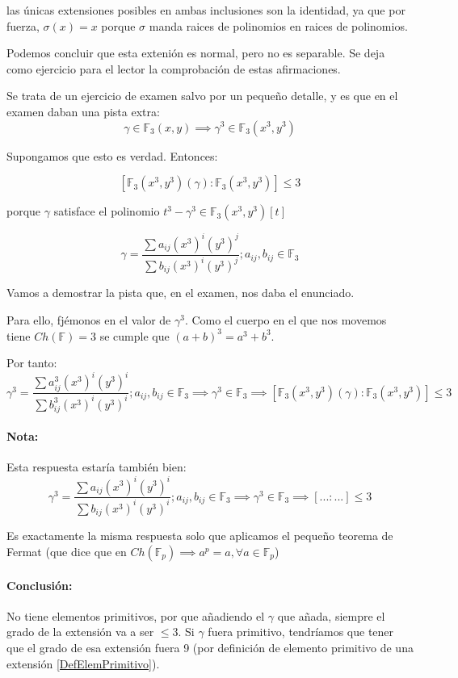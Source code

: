 \begin{problem}[3]
las únicas extensiones posibles en ambas inclusiones son la identidad, ya que por fuerza, $σ(x) = x$ porque $σ$ manda raices de polinomios en raices de polinomios.


Podemos concluir que esta extenión es normal, pero no es separable. Se deja como ejercicio para el lector la comprobación de estas afirmaciones.

\spart Se trata de un ejercicio de examen salvo por un pequeño detalle, y es que en el examen daban una pista extra:
\[γ∈\mathbb{F}_3(x,y) \implies γ^3 ∈\mathbb{F}_3(x^3,y^3)\]

Supongamos que esto es verdad. Entonces: 

\[[\mathbb{F}_3(x^3,y^3)(γ) : \mathbb{F}_3(x^3,y^3)] ≤ 3\] 

porque $γ$ satisface el polinomio $t^3 -γ^3 ∈ \mathbb{F}_3(x^3,y^3)[t]$

\[γ = \frac{\sum a_{ij}(x^3)^i(y^3)^j}{\sum b_{ij}(x^3)^i(y^3)^j}; a_{ij},b_{ij} ∈ \mathbb{F}_3\]

Vamos a demostrar la pista que, en el examen, nos daba el enunciado.

Para ello, fjémonos en el valor de $γ^3$. Como el cuerpo en el que nos movemos tiene $Ch(\mathbb{F}) = 3$ se cumple que $(a+b)^{3} = a^3 + b^3$.

Por tanto: 
\[γ^3 = \frac{\sum a_{ij}^3(x^3)^i(y^3)^i}{\sum b_{ij}^3(x^3)^i(y^3)^i}; a_{ij},b_{ij} ∈ \mathbb{F}_3 \implies γ^3 ∈ \mathbb{F}_3 \implies [\mathbb{F}_3(x^3,y^3)(γ) : \mathbb{F}_3(x^3,y^3)] ≤ 3\]

\paragraph{Nota:} Esta respuesta estaría también bien:
$$γ^3 = \frac{\sum a_{ij}(x^3)^i(y^3)^i}{\sum b_{ij}(x^3)^i(y^3)^i}; a_{ij},b_{ij} ∈ \mathbb{F}_3 \implies γ^3 ∈ \mathbb{F}_3 \implies [... : ...] ≤ 3$$

Es exactamente la misma respuesta solo que aplicamos el pequeño teorema de Fermat (que dice que en $Ch(\mathbb{F}_p) \implies a^p = a, ∀a∈\mathbb{F}_p$)


\paragraph{Conclusión:} No tiene elementos primitivos, por que añadiendo el $γ$ que añada, siempre el grado de la extensión va a ser $≤3$. Si $γ$ fuera primitivo, tendríamos que tener que el grado de esa extensión fuera 9 (por definición de elemento primitivo de una extensión \ref{DefElemPrimitivo}).

\end{problem}


